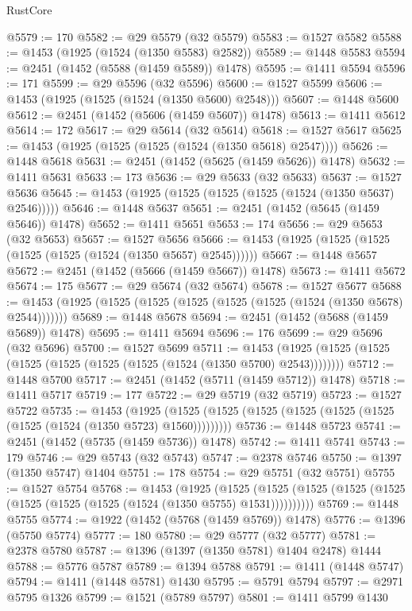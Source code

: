 \begin{lexlean}{RustCore}
\begin{coremodule}
@5579 := 170
@5582 := @29 @5579 (@32 @5579)
@5583 := @1527 @5582
@5588 := @1453 (@1925 (@1524 (@1350 @5583) @2582))
@5589 := @1448 @5583
@5594 := @2451 (@1452 (@5588 (@1459 @5589)) @1478)
@5595 := @1411 @5594
@5596 := 171
@5599 := @29 @5596 (@32 @5596)
@5600 := @1527 @5599
@5606 := @1453 (@1925 (@1525 (@1524 (@1350 @5600) @2548)))
@5607 := @1448 @5600
@5612 := @2451 (@1452 (@5606 (@1459 @5607)) @1478)
@5613 := @1411 @5612
@5614 := 172
@5617 := @29 @5614 (@32 @5614)
@5618 := @1527 @5617
@5625 := @1453 (@1925 (@1525 (@1525 (@1524 (@1350 @5618) @2547))))
@5626 := @1448 @5618
@5631 := @2451 (@1452 (@5625 (@1459 @5626)) @1478)
@5632 := @1411 @5631
@5633 := 173
@5636 := @29 @5633 (@32 @5633)
@5637 := @1527 @5636
@5645 := @1453 (@1925 (@1525 (@1525 (@1525 (@1524 (@1350 @5637) @2546)))))
@5646 := @1448 @5637
@5651 := @2451 (@1452 (@5645 (@1459 @5646)) @1478)
@5652 := @1411 @5651
@5653 := 174
@5656 := @29 @5653 (@32 @5653)
@5657 := @1527 @5656
@5666 := @1453 (@1925 (@1525 (@1525 (@1525 (@1525 (@1524 (@1350 @5657) @2545))))))
@5667 := @1448 @5657
@5672 := @2451 (@1452 (@5666 (@1459 @5667)) @1478)
@5673 := @1411 @5672
@5674 := 175
@5677 := @29 @5674 (@32 @5674)
@5678 := @1527 @5677
@5688 := @1453 (@1925 (@1525 (@1525 (@1525 (@1525 (@1525 (@1524 (@1350 @5678) @2544)))))))
@5689 := @1448 @5678
@5694 := @2451 (@1452 (@5688 (@1459 @5689)) @1478)
@5695 := @1411 @5694
@5696 := 176
@5699 := @29 @5696 (@32 @5696)
@5700 := @1527 @5699
@5711 := @1453 (@1925 (@1525 (@1525 (@1525 (@1525 (@1525 (@1525 (@1524 (@1350 @5700) @2543))))))))
@5712 := @1448 @5700
@5717 := @2451 (@1452 (@5711 (@1459 @5712)) @1478)
@5718 := @1411 @5717
@5719 := 177
@5722 := @29 @5719 (@32 @5719)
@5723 := @1527 @5722
@5735 := @1453
    (@1925 (@1525 (@1525 (@1525 (@1525 (@1525 (@1525 (@1525 (@1524 (@1350 @5723) @1560)))))))))
@5736 := @1448 @5723
@5741 := @2451 (@1452 (@5735 (@1459 @5736)) @1478)
@5742 := @1411 @5741
@5743 := 179
@5746 := @29 @5743 (@32 @5743)
@5747 := @2378 @5746
@5750 := @1397 (@1350 @5747) @1404
@5751 := 178
@5754 := @29 @5751 (@32 @5751)
@5755 := @1527 @5754
@5768 := @1453
    (@1925
      (@1525 (@1525 (@1525 (@1525 (@1525 (@1525 (@1525 (@1525 (@1524 (@1350 @5755) @1531))))))))))
@5769 := @1448 @5755
@5774 := @1922 (@1452 (@5768 (@1459 @5769)) @1478)
@5776 := @1396 (@5750 @5774)
@5777 := 180
@5780 := @29 @5777 (@32 @5777)
@5781 := @2378 @5780
@5787 := @1396 (@1397 (@1350 @5781) @1404 @2478) @1444
@5788 := @5776 @5787
@5789 := @1394 @5788
@5791 := @1411 (@1448 @5747)
@5794 := @1411 (@1448 @5781) @1430
@5795 := @5791 @5794
@5797 := @2971 @5795 @1326
@5799 := @1521 (@5789 @5797)
@5801 := @1411 @5799 @1430

\end{coremodule}
\end{lexlean}

